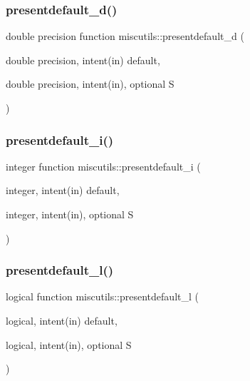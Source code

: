 \subsubsection{\texorpdfstring{presentdefault\+\_\+d()}{presentdefault\_d()}}
{\footnotesize\ttfamily double precision function miscutils\+::presentdefault\+\_\+d (\begin{DoxyParamCaption}\item[{double precision, intent(in)}]{default,  }\item[{double precision, intent(in), optional}]{S }\end{DoxyParamCaption})}

\mbox{\label{namespacemiscutils_aed7390d30a673aa276cdcc01a48c217a}} 
\subsubsection{\texorpdfstring{presentdefault\+\_\+i()}{presentdefault\_i()}}
{\footnotesize\ttfamily integer function miscutils\+::presentdefault\+\_\+i (\begin{DoxyParamCaption}\item[{integer, intent(in)}]{default,  }\item[{integer, intent(in), optional}]{S }\end{DoxyParamCaption})}

\mbox{\label{namespacemiscutils_a990745dc5884aa0e44f6025bc182208e}} 
\subsubsection{\texorpdfstring{presentdefault\+\_\+l()}{presentdefault\_l()}}
{\footnotesize\ttfamily logical function miscutils\+::presentdefault\+\_\+l (\begin{DoxyParamCaption}\item[{logical, intent(in)}]{default,  }\item[{logical, intent(in), optional}]{S }\end{DoxyParamCaption})}

\mbox{\label{namespacemiscutils_a7a5fc2947194e21c6a752c3897bcf7a3}} 
